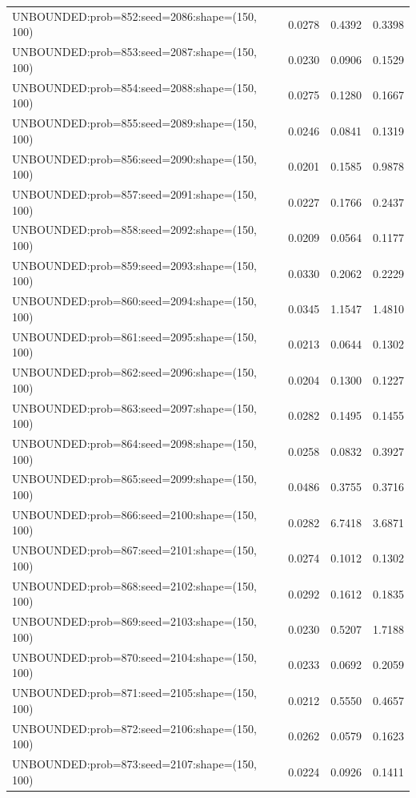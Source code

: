 \begin{longtable}{lccc}
UNBOUNDED:prob=852:seed=2086:shape=(150, 100) &   0.0278 &  0.4392 &  0.3398 \\
UNBOUNDED:prob=853:seed=2087:shape=(150, 100) &   0.0230 &  0.0906 &  0.1529 \\
UNBOUNDED:prob=854:seed=2088:shape=(150, 100) &   0.0275 &  0.1280 &  0.1667 \\
UNBOUNDED:prob=855:seed=2089:shape=(150, 100) &   0.0246 &  0.0841 &  0.1319 \\
UNBOUNDED:prob=856:seed=2090:shape=(150, 100) &   0.0201 &  0.1585 &  0.9878 \\
UNBOUNDED:prob=857:seed=2091:shape=(150, 100) &   0.0227 &  0.1766 &  0.2437 \\
UNBOUNDED:prob=858:seed=2092:shape=(150, 100) &   0.0209 &  0.0564 &  0.1177 \\
UNBOUNDED:prob=859:seed=2093:shape=(150, 100) &   0.0330 &  0.2062 &  0.2229 \\
UNBOUNDED:prob=860:seed=2094:shape=(150, 100) &   0.0345 &  1.1547 &  1.4810 \\
UNBOUNDED:prob=861:seed=2095:shape=(150, 100) &   0.0213 &  0.0644 &  0.1302 \\
UNBOUNDED:prob=862:seed=2096:shape=(150, 100) &   0.0204 &  0.1300 &  0.1227 \\
UNBOUNDED:prob=863:seed=2097:shape=(150, 100) &   0.0282 &  0.1495 &  0.1455 \\
UNBOUNDED:prob=864:seed=2098:shape=(150, 100) &   0.0258 &  0.0832 &  0.3927 \\
UNBOUNDED:prob=865:seed=2099:shape=(150, 100) &   0.0486 &  0.3755 &  0.3716 \\
UNBOUNDED:prob=866:seed=2100:shape=(150, 100) &   0.0282 &  6.7418 &  3.6871 \\
UNBOUNDED:prob=867:seed=2101:shape=(150, 100) &   0.0274 &  0.1012 &  0.1302 \\
UNBOUNDED:prob=868:seed=2102:shape=(150, 100) &   0.0292 &  0.1612 &  0.1835 \\
UNBOUNDED:prob=869:seed=2103:shape=(150, 100) &   0.0230 &  0.5207 &  1.7188 \\
UNBOUNDED:prob=870:seed=2104:shape=(150, 100) &   0.0233 &  0.0692 &  0.2059 \\
UNBOUNDED:prob=871:seed=2105:shape=(150, 100) &   0.0212 &  0.5550 &  0.4657 \\
UNBOUNDED:prob=872:seed=2106:shape=(150, 100) &   0.0262 &  0.0579 &  0.1623 \\
UNBOUNDED:prob=873:seed=2107:shape=(150, 100) &   0.0224 &  0.0926 &  0.1411 \\

\end{longtable}
